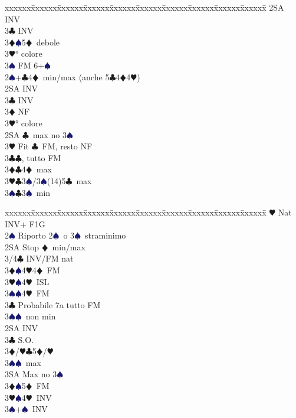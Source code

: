\documentclass[a4paper,italian]{article}
\newcommand{\BC}{\textcolor{OliveGreen}{$\clubsuit$}}
\newcommand{\BD}{\textcolor{RedOrange}{$\vardiamondsuit$}}
\newcommand{\BH}{\textcolor{Red2}{$\varheartsuit${}}}
\newcommand{\BS}{\textcolor{MidnightBlue}{$\spadesuit${}}}
\newenvironment{bidtable}
{\begin{tabbing}

    xxxxxx\=xxxxxx\=xxxxxx\=xxxxxx\=xxxxxx\=xxxxxx\=xxxxxx\=xxxxxx\=xxxxxx\=xxxxxx\=\kill}
{\end{tabbing} }%
\begin{document}
\begin{multicols}{2}
\begin{bidtable}
        2SA \> INV\\
        3\BC \> INV\\
        3\BD {}\BS 5\BD\ debole\\
        3\BH {}° colore\\
        3\BS \> FM 6+\BS\-\\
        2\BS {}+\BC 4\BD\ min/max (anche 5\BC 4\BD 4\BH )\+\\
        2SA \> INV\\
        3\BC \> INV\\
        3\BD \> NF\\
        3\BH {}° colore\-\\
        2SA \BC\ max no 3\BS \+\\
        3\BH \> Fit \BC\ FM, resto NF\-\\
        3\BC {}\BC , tutto FM\\
        3\BD {}\BC 4\BD\ max\\
        3\BH {}\BC 3\BS /3\BS (14)5\BC\ max\\
        3\BS {}\BC 3\BS\ min
    \end{bidtable}
    \vfill\null
    \columnbreak
    \begin{bidtable}
        \BH \> Nat INV+ F1G\+\+\\
        2\BS \> Riporto 2\BS\ o 3\BS\ straminimo\\
        2SA \> Stop \BD\ min/max\+\\
        3/4\BC \> INV/FM nat\\
        3\BD {}\BS 4\BH 4\BD\ FM\\
        3\BH {}\BS 4\BH\ ISL\\
        3\BS {}\BS 4\BH\ FM\-\\
        3\BC \> Probabile 7a tutto FM\\
        3\BS {}\BS\ non min\-\\
        2SA \> INV\+\\
        3\BC \> S.O.\\
        3\BD/\BH {}\BC 5\BD /\BH \\
        3\BS {}\BS\ max\\
        3SA \> Max no 3\BS \-\\
        3\BD {}\BS 5\BD\ FM\\
        3\BH {}\BS 4\BH\ INV\\
        3\BS {}+\BS\ INV\-\\
    \end{bidtable}


\end{multicols}
\end{document}
